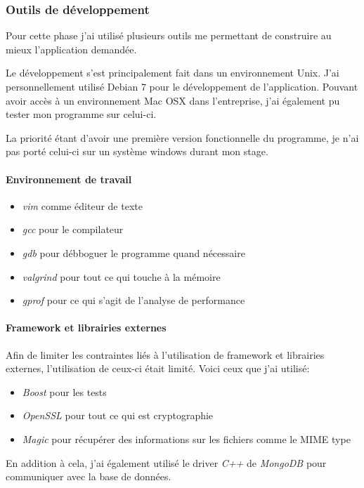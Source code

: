 \documentclass[a4paper,10pt, twoside]{report}
\begin{document}
\begin{spacing}{1.2}
\subsubsection{Outils de d\'eveloppement}
Pour cette phase j'ai utilis\'e plusieurs outils me permettant de construire
au mieux l'application demand\'ee. 

Le d\'eveloppement s'est principalement fait dans un environnement Unix. J'ai
personnellement utilis\'e Debian 7 pour le d\'eveloppement de l'application.
Pouvant avoir acc\`es \`a un environnement Mac OSX dans l'entreprise, j'ai
\'egalement pu tester mon programme sur celui-ci.

La priorit\'e \'etant d'avoir une premi\`ere version fonctionnelle du
programme, je n'ai pas port\'e celui-ci sur un syst\`eme windows durant mon
stage.

\paragraph{Environnement de travail}
\begin{itemize}
 \item \textit{vim} comme \'editeur de texte
 \item \textit{gcc} pour le compilateur
 \item \textit{gdb} pour d\'ebboguer le programme quand n\'ecessaire
 \item \textit{valgrind} pour tout ce qui touche \`a la m\'emoire
 \item \textit{gprof} pour ce qui s'agit de l'analyse de performance
\end{itemize}

\paragraph{Framework et librairies externes}
Afin de limiter les contraintes li\'es \`a l'utilisation de framework et
librairies externes, l'utilisation de ceux-ci \'etait limit\'e. Voici
ceux que j'ai utilis\'e:
\begin{itemize}
 \item \textit{Boost} pour les tests
 \item \textit{OpenSSL} pour tout ce qui est cryptographie
 \item \textit{Magic} pour r\'ecup\'erer des informations sur les fichiers
 comme le MIME type
\end{itemize}

En addition \`a cela, j'ai \'egalement utilis\'e le driver \textit{C++} de
\textit{MongoDB} pour communiquer avec la base de donn\'ees.



\end{spacing}
\end{document}
